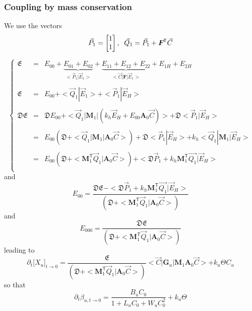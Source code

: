 \documentclass[aps,onecolumn,11pt]{revtex4}
\newcommand{\myconc}[1]{\big[#1\big]}
\newcommand{\mytrn}[1]{{#1}^{\!\mathsf{T}}}
\newcommand{\mymat}[1]{{\bm{#1}}}
\begin{document}
\subsubsection{Coupling by mass conservation}
We use the vectors
\begin{equation}
	\vec{P}_1 = 
	\begin{bmatrix}
	1\\
	1\\
	\end{bmatrix},
	\;\;
\vec{Q}_1  =  \vec{P}_1 + \mytrn{\mymat{F}}\vec{C} \\
\end{equation}

\begin{equation}
\left\lbrace
\begin{array}{rcl}
\mathfrak{E} & = & E_{00} + \underbrace{E_{01} + E_{02}}_{<\vec{P}_1|\vec{E}_1>} + \underbrace{E_{11} + E_{12} + E_{22}}_{<\vec{C}|\mymat{F}|\vec{E}_1>} + E_{1H} + E_{2H} \\
\\
\mathfrak{E} & = & E_{00} + <\vec{Q}_1|\vec{E}_1> +  <\vec{P}_1|\vec{E}_H>\\
\\
\mathfrak{D}\mathfrak{E} & = & 
\mathfrak{D} E_{00} + 
<\vec{Q}_1|\mymat{M}_1|\left(
	k_h  \vec{E}_H +E_{00} \mymat{A}_0 \vec{C} \right)> +  \mathfrak{D} <\vec{P}_1|\vec{E}_H>\\
	\\
 & = & E_{00} \left( \mathfrak{D} + <\vec{Q}_1|\mymat{M}_1|\mymat{A}_0\vec{C}>\right) + 
\mathfrak{D} <\vec{P}_1|\vec{E}_H> + k_h <\vec{Q}_1|\mymat{M}_1|\vec{E}_H>\\
\\
& = & E_{00} \left( \mathfrak{D} + <\mytrn{\mymat{M}}_1\vec{Q}_1|\mymat{A}_0\vec{C}>\right) + < \mathfrak{D} \vec{P}_1 + k_h\mytrn{\mymat{M}}_1 \vec{Q_1} | \vec{E}_H>\\
\end{array}
\right.
\end{equation}
and
\begin{equation}
	E_{00} = 
	\dfrac
	{\mathfrak{D}\mathfrak{E}-< \mathfrak{D} \vec{P}_1 + k_h\mytrn{\mymat{M}}_1 \vec{Q_1} | \vec{E}_H>}
	{\left( \mathfrak{D} + <\mytrn{\mymat{M}}_1\vec{Q}_1|\mymat{A}_0\vec{C}>\right)}
\end{equation}
and
\begin{equation}
	E_{000} = 
	\dfrac
	{\mathfrak{D}\mathfrak{E}}
	{\left( \mathfrak{D} + <\mytrn{\mymat{M}}_1\vec{Q}_1|\mymat{A}_0\vec{C}>\right)}
\end{equation}
leading to
\begin{equation}
	\partial_t \myconc{X_u}_{t\to0}  =   \dfrac{\mathfrak{E}}{\left( \mathfrak{D} + <\mytrn{\mymat{M}}_1\vec{Q}_1|\mymat{A}_0\vec{C}>\right)}	
	<\vec{C}|\mymat{G}_u|\mymat{M}_1\mymat{A}_0\vec{C}> + k_u\Theta C_u 
\end{equation}
so that
\begin{equation}
	\partial_t {\beta_{u,t\to0}} = \dfrac{B_u C_0}{1+L_u C_0 + W_u C_0^2} + k_u \Theta
\end{equation}
\end{document}

